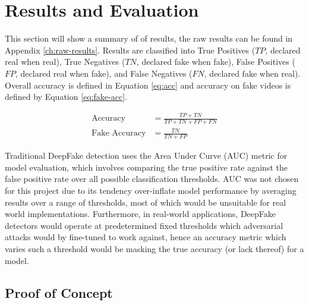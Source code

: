 \chapter{Results and Evaluation}
\label{ch:evaluation}

This section will show a summary of of results, the raw results can be found in Appendix \ref{ch:raw-results}. Results are classified into True Positives ($TP$, declared real when real), True Negatives ($TN$, declared fake when fake), False Positives ($FP$, declared real when fake), and False Negatives ($FN$, declared fake when real). Overall accuracy is defined in Equation \ref{eq:acc} and accuracy on fake videos is defined by Equation \ref{eq:fake-acc}.

\begin{align}
    \text{Accuracy} &= \frac{TP+TN}{TP+TN+FP+FN} \label{eq:acc} \\
    \text{Fake Accuracy} &= \frac{TN}{TN+FP} \label{eq:fake-acc}
\end{align}

Traditional DeepFake detection uses the Area Under Curve (AUC) metric for model evaluation, which involves comparing the true positive rate against the false positive rate over all possible classification thresholds. AUC was not chosen for this project due to its tendency over-inflate model performance by averaging results over a range of thresholds, most of which would be unsuitable for real world implementations\cite{ricker2022towards}. Furthermore, in real-world applications, DeepFake detectors would operate at predetermined fixed thresholds which adversarial attacks would by fine-tuned to work against, hence an accuracy metric which varies such a threshold would be masking the true accuracy (or lack thereof) for a model.

\section{Proof of Concept}
\label{sec:concept-results}


